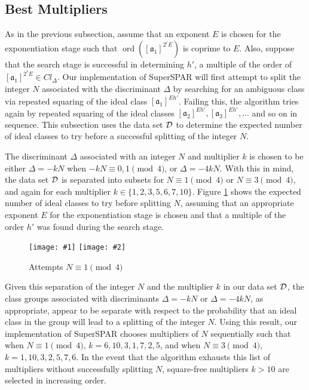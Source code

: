 \documentclass{ucalgthes1}
\theoremstyle{definition}
\DeclareMathOperator{\ord}{ord}
\newcommand{\ideal}{\mathfrak}
\newcommand{\idealclass}[1]{\left[ \ideal #1 \right]}
\newcommand{\mygraphTwo}[4]{
	\begin{figure}[htb]
	\centering
	\texttt{[image: \#1]}
	\texttt{[image: \#2]}
	\caption{#4}
	\label{#3}
	\end{figure}
}
\begin{document}
\subsection{Best Multipliers}
\label{subsec:ssparBestMultipliers}

As in the previous subsection, assume that an exponent $E$ is chosen for the exponentiation stage such that $\ord(\idealclass{a_1}^{2^\ell E})$ is coprime to $E$.  Also, suppose that the search stage is successful in determining $h'$, a multiple of the order of $\idealclass{a_1}^{2^\ell E} \in Cl_\Delta$.  Our implementation of SuperSPAR will first attempt to split the integer $N$ associated with the discriminant $\Delta$ by searching for an ambiguous class via repeated squaring of the ideal class $\idealclass{a_1}^{Eh'}$.  Failing this, the algorithm tries again by repeated squaring of the ideal classes $\idealclass{a_2}^{Eh'}, \idealclass{a_3}^{Eh'}, ...$ and so on in sequence.  This subsection uses the data set $\mathcal D$ to determine the expected number of ideal classes to try before a successful splitting of the integer $N$.

The discriminant $\Delta$ associated with an integer $N$ and multiplier $k$ is chosen to be either $\Delta = -kN$ when $-kN \equiv 0, 1 \pmod 4$, or $\Delta = -4kN$.  With this in mind, the data set $\mathcal D$ is separated into subsets for $N \equiv 1 \pmod 4$ or $N \equiv 3 \pmod 4$, and again for each multiplier $k \in \{1, 2, 3, 5, 6, 7, 10\}$.  Figure \ref{fig:ssparIdealAttempts} shows the expected number of ideal classes to try before splitting $N$, assuming that an appropriate exponent $E$ for the exponentiation stage is chosen and that a multiple of the order $h'$ was found during the search stage.

\mygraphTwo{attempts-n1}{attempts-n3}{fig:ssparIdealAttempts}{Attempts $N \equiv 1 \pmod 4$}

Given this separation of the integer $N$ and the multiplier $k$ in our data set $\mathcal D$, the class groups associated with discriminants $\Delta = -kN$ or $\Delta = -4kN$, as appropriate, appear to be separate with respect to the probability that an ideal class in the group will lead to a splitting of the integer $N$.  Using this result, our implementation of SuperSPAR chooses multipliers of $N$ sequentially such that when $N \equiv 1 \pmod 4$, $k=6, 10, 3, 1, 7, 2, 5$, and when $N \equiv 3 \pmod 4$, $k=1, 10, 3, 2, 5, 7, 6$.  In the event that the algorithm exhausts this list of multipliers without successfully splitting $N$, square-free multipliers $k > 10$ are selected in increasing order.
\end{document}
